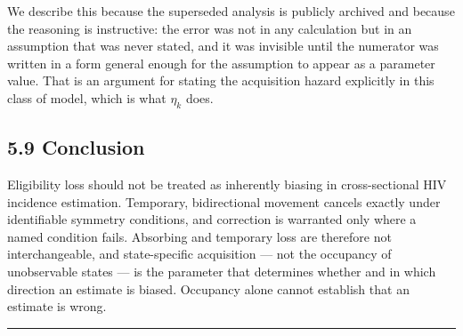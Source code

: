 We describe this because the superseded analysis is publicly archived and because the reasoning is instructive: the error was not in any calculation but in an assumption that was never stated, and it was invisible until the numerator was written in a form general enough for the assumption to appear as a parameter value. That is an argument for stating the acquisition hazard explicitly in this class of model, which is what \(\eta_k\) does.

\subsection{5.9 Conclusion}

Eligibility loss should not be treated as inherently biasing in cross-sectional HIV incidence estimation. Temporary, bidirectional movement cancels exactly under identifiable symmetry conditions, and correction is warranted only where a named condition fails. Absorbing and temporary loss are therefore not interchangeable, and state-specific acquisition --- not the occupancy of unobservable states --- is the parameter that determines whether and in which direction an estimate is biased. Occupancy alone cannot establish that an estimate is wrong.

\begin{center}\rule{0.5\linewidth}{0.5pt}\end{center}

